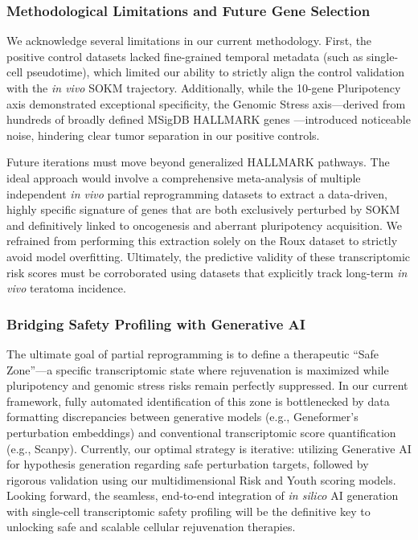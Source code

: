 \documentclass[10pt,twocolumn]{article}
\newcommand{\SOKM}{SOKM}
\begin{document}
\subsubsection{Methodological Limitations and Future Gene Selection}
We acknowledge several limitations in our current methodology. First, the positive control datasets lacked fine-grained temporal metadata (such as single-cell pseudotime), which limited our ability to strictly align the control validation with the \textit{in vivo} \SOKM{} trajectory. Additionally, while the 10-gene Pluripotency axis demonstrated exceptional specificity, the Genomic Stress axis---derived from hundreds of broadly defined MSigDB HALLMARK genes \citep{liberzon2015}---introduced noticeable noise, hindering clear tumor separation in our positive controls.

Future iterations must move beyond generalized HALLMARK pathways. The ideal approach would involve a comprehensive meta-analysis of multiple independent \textit{in vivo} partial reprogramming datasets to extract a data-driven, highly specific signature of genes that are both exclusively perturbed by \SOKM{} and definitively linked to oncogenesis and aberrant pluripotency acquisition. We refrained from performing this extraction solely on the Roux dataset \citep{roux2022} to strictly avoid model overfitting. Ultimately, the predictive validity of these transcriptomic risk scores must be corroborated using datasets that explicitly track long-term \textit{in vivo} teratoma incidence.

\subsubsection{Bridging Safety Profiling with Generative AI}
The ultimate goal of partial reprogramming is to define a therapeutic ``Safe Zone''---a specific transcriptomic state where rejuvenation is maximized while pluripotency and genomic stress risks remain perfectly suppressed. In our current framework, fully automated identification of this zone is bottlenecked by data formatting discrepancies between generative models (e.g., Geneformer's perturbation embeddings) and conventional transcriptomic score quantification (e.g., Scanpy). Currently, our optimal strategy is iterative: utilizing Generative AI for hypothesis generation regarding safe perturbation targets, followed by rigorous validation using our multidimensional Risk and Youth scoring models. Looking forward, the seamless, end-to-end integration of \textit{in silico} AI generation with single-cell transcriptomic safety profiling will be the definitive key to unlocking safe and scalable cellular rejuvenation therapies.



\end{document}
